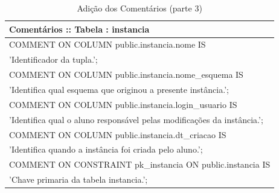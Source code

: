 \documentclass[graduacao,brazil]{ThesisPUC}
\begin{document}
\begin{table}[H]
{\begin{tabular}{|l|}
    Comentários :: Tabela : instancia                                                                                                                                                                                                                                                                                                                                                                                                                                                                                                                                                                                                                                  \\ \hline
    COMMENT ON COLUMN public.instancia.nome IS \\'Identificador da tupla.'; \\COMMENT ON COLUMN public.instancia.nome\_esquema IS \\'Identifica qual esquema que originou a presente instância.'; \\COMMENT ON COLUMN public.instancia.login\_usuario IS \\'Identifica qual o aluno responsável pelas modificações da instância.'; \\COMMENT ON COLUMN public.instancia.dt\_criacao IS \\'Identifica quando a instância foi criada pelo aluno.'; \\COMMENT ON CONSTRAINT pk\_instancia ON public.instancia IS \\'Chave primaria da tabela instancia.';                                                                                                                 \\ \hline
    \end{tabular}
    }
    \caption {Adi\c{c}\~{a}o dos Coment\'{a}rios (parte 3)}
\end{table}

\end{document}
